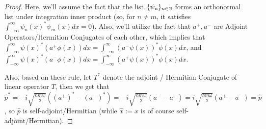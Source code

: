 \documentclass{article}
\begin{document}
\begin{proof}

    Here, we'll assume the fact that the list $\{\psi_n\}_{n\in\mathbb{N}}$ forms an orthonormal list under integration inner product (so, for $n\neq m$, it satisfies $\int_{-\infty}^{\infty}\psi_n(x)^*\psi_m(x)dx=0$). Also, we'll utilize the fact that $a^+,a^-$ are Adjoint Operators/Hermition Conjugates of each other, which implies that $\int_{-\infty}^{\infty}\psi(x)^* (a^+\phi(x))dx=\int_{-\infty}^{\infty}(a^-\psi(x))^* \phi(x)dx$, and $\int_{-\infty}^{\infty}\psi(x)^* (a^-\phi(x))dx=\int_{-\infty}^{\infty}(a^+\psi(x))^* \phi(x)dx$.

    Also, based on these rule, let $T^*$ denote the adjoint / Hermitian Conjugate of linear operator $T$, then we get that $\hat{p}^* = -i\sqrt{\frac{\hbar mw}{2}}((a^+)^*-(a^-)^*) = -i\sqrt{\frac{\hbar mw}{2}}(a^--a^+) = i\sqrt{\frac{\hbar m\omega}{2}} (a^+ - a^-) = \hat{p}$, so $\hat{p}$ is self-adjoint/Hermitian (while $\hat{x}:= x$ is of course self-adjoint/Hermitian).


\end{proof}
\end{document}
